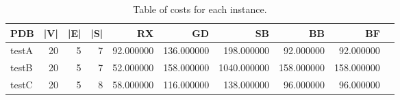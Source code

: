 \begin{table}
\caption{Table of costs for each instance.}
\label{tab:costs}
\begin{tabular}{lrrrrrrrrr}
\toprule
PDB & |V| & |E| & |S| & RX & GD & SB & BB & BF \\
\midrule
testA & 20 & 5 & 7 & 92.000000 & 136.000000 & 198.000000 & 92.000000 & 92.000000 \\
testB & 20 & 5 & 7 & 52.000000 & 158.000000 & 1040.000000 & 158.000000 & 158.000000 \\
testC & 20 & 5 & 8 & 58.000000 & 116.000000 & 138.000000 & 96.000000 & 96.000000 \\
\bottomrule
\end{tabular}
\end{table}
